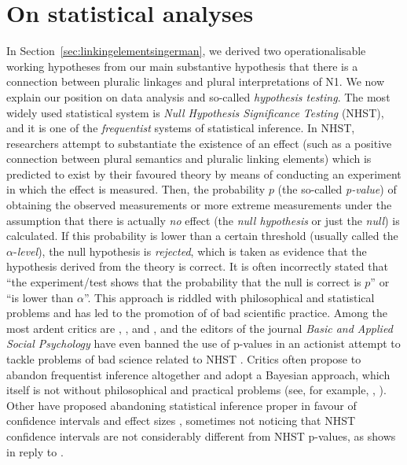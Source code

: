 \appendix
\section{On statistical analyses}
\label{sec:onstatisticalanalyses}

In Section~\ref{sec:linkingelementsingerman}, we derived two operationalisable working hypotheses from our main substantive hypothesis that there is a connection between pluralic linkages and plural interpretations of N1.
We now explain our position on data analysis and so-called \textit{hypothesis testing}.
The most widely used statistical system is \textit{Null Hypothesis Significance Testing} (NHST), and it is one of the \textit{frequentist} systems of statistical inference.
In NHST, researchers attempt to substantiate the existence of an effect (such as a positive connection between plural semantics and pluralic linking elements) which is predicted to exist by their favoured theory by means of conducting an experiment in which the effect is measured.
Then, the probability $p$ (the so-called \textit{p-value}) of obtaining the observed measurements or more extreme measurements under the assumption that there is actually \textit{no} effect (the \textit{null hypothesis} or just the \textit{null}) is calculated.
If this probability is lower than a certain threshold (usually called the $\alpha$-\textit{level}), the null hypothesis is \textit{rejected}, which is taken as evidence that the hypothesis derived from the theory is correct.
It is often incorrectly stated that ``the experiment\slash test shows that the probability that the null is correct is $p$'' or ``is lower than $\alpha$''.
This approach is riddled with philosophical and statistical problems and has led to the promotion of of bad scientific practice.
Among the most ardent critics are \textcite{Gigerenzer2004}, \textcite{Colquhoun2014}, and \textcite{MunafoEa2017}, and the editors of the journal \textit{Basic and Applied Social Psychology} have even banned the use of p-values in an actionist attempt to tackle problems of bad science related to NHST \parencite{TrafimowMarks2016}.
Critics often propose to abandon frequentist inference altogether and adopt a Bayesian approach, which itself is not without philosophical and practical problems (see, for example, \citealt{Mayo1996}, \citealt{Senn2011}).
Other have proposed abandoning statistical inference proper in favour of confidence intervals and effect sizes \parencite{Cumming2014}, sometimes not noticing that NHST confidence intervals are not considerably different from NHST p-values, as \textcite{Perezgonzalez2015b} shows in reply to \textcite{Cumming2014}.

